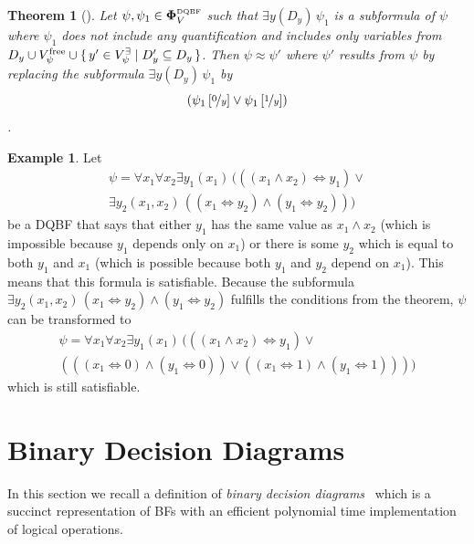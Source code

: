 \documentclass[
  digital, %
  color,
  twoside, %
  table,   %
  nolof,     %
  nolot,     %
]{fithesis3}
\let\setbuilder\set
\newcommand{\simpleset}[1]{\{{#1}\}}
\renewcommand{\set}[1]{\normalexpandarg\IfSubStr{#1}{|}{\setbuilder{#1}}{\simpleset{#1}}}
\newtheorem{theorem}{Theorem}[chapter] %
\theoremstyle{definition}
\newtheorem{example}{Example}
\theoremstyle{remark}
\newcommand{\substitute}[2]{\left[ \nicefrac{#2}{#1} \right]}
\newcommand{\DQBF}[1]{\mathbf{\Phi}_{#1}^{\normalfont{\text{\tiny DQBF}}}}
\newcommand{\evars}[1]{V_{#1}^{\exists}}
\newcommand{\fvars}[1]{V_{#1}^{\mathrm{free}}}
\newcommand{\lequal}{\Leftrightarrow}
\newcommand{\itholds}{\,}
\begin{document}
\begin{theorem}[{\cite[Theorem 5]{HQSquantifierLocalisation}}]
\label{thrm:exElim}
  Let $\psi, \psi_1 \in \DQBF{V}$ such that $\exists y(D_y)\itholds\psi_1$ is a subformula of $\psi$ where $\psi_1$ does not include any quantification and includes only variables from $D_y \cup \fvars{\psi} \cup \set{y' \in \evars{\psi} | D_y' \subseteq D_y}$. Then $\psi \approx \psi'$ where $\psi'$ results from $\psi$ by replacing the subformula $\exists y(D_y)\itholds\psi_1$ by \[(\psi_1\substitute{y}{0} \lor \psi_1\substitute{y}{1})\].
\end{theorem}
\begin{example}
Let
\begin{multline*}
\psi = \forall x_1 \forall x_2 \exists y_1(x_1) \itholds (((x_1 \land x_2) \lequal y_1) \lor {} \\
\exists y_2 (x_1,x_2) \itholds ((x_1 \lequal y_2) \land (y_1 \lequal y_2)))
\end{multline*}
be a DQBF that says that either $y_1$ has the same value as $x_1 \land x_2$ (which is impossible because $y_1$ depends only on $x_1$) or there is some $y_2$ which is equal to both $y_1$ and $x_1$ (which is possible because both $y_1$ and $y_2$ depend on $x_1$). This means that this formula is satisfiable. Because the subformula $\exists y_2 (x_1,x_2) \itholds (x_1 \lequal y_2) \land (y_1 \lequal y_2)$ fulfills the conditions from the theorem, $\psi$ can be transformed to
\begin{multline*}
\psi = \forall x_1 \forall x_2 \exists y_1(x_1) \itholds (((x_1 \land x_2) \lequal y_1) \lor {}\\
(((x_1 \lequal 0) \land (y_1 \lequal 0)) \lor ((x_1 \lequal 1) \land (y_1 \lequal 1))))
\end{multline*}
which is still satisfiable.
\end{example}



\section{Binary Decision Diagrams}
In this section we recall a definition of \emph{binary decision diagrams}~\cite{BDD} which is a succinct representation of BFs with an efficient polynomial time implementation of logical operations.
\end{document}
